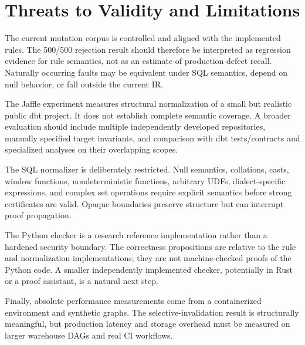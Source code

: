 \section{Threats to Validity and Limitations}

The current mutation corpus is controlled and aligned with the implemented rules. The 500/500 rejection result should therefore be interpreted as regression evidence for rule semantics, not as an estimate of production defect recall. Naturally occurring faults may be equivalent under SQL semantics, depend on null behavior, or fall outside the current IR.

The Jaffle experiment measures structural normalization of a small but realistic public dbt project. It does not establish complete semantic coverage. A broader evaluation should include multiple independently developed repositories, manually specified target invariants, and comparison with dbt tests/contracts and specialized analyses on their overlapping scopes.

The SQL normalizer is deliberately restricted. Null semantics, collations, casts, window functions, nondeterministic functions, arbitrary UDFs, dialect-specific expressions, and complex set operations require explicit semantics before strong certificates are valid. Opaque boundaries preserve structure but can interrupt proof propagation.

The Python checker is a research reference implementation rather than a hardened security boundary. The correctness propositions are relative to the rule and normalization implementations; they are not machine-checked proofs of the Python code. A smaller independently implemented checker, potentially in Rust or a proof assistant, is a natural next step.

Finally, absolute performance measurements come from a containerized environment and synthetic graphs. The selective-invalidation result is structurally meaningful, but production latency and storage overhead must be measured on larger warehouse DAGs and real CI workflows.

